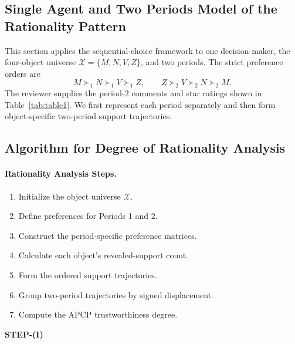 \documentclass[conference]{IEEEtran}
\theoremstyle{plain}
\theoremstyle{definition}
\theoremstyle{remark}
\begin{document}
	\subsection{Single Agent and Two Periods Model of the Rationality Pattern}
	This section applies the sequential-choice framework to one decision-maker, the four-object universe $\mathcal X=\{M,N,V,Z\}$, and two periods. The strict preference orders are
	\begin{equation}
		M\succ_1 N\succ_1 V\succ_1 Z,
		\qquad
		Z\succ_2 V\succ_2 N\succ_2 M.
	\end{equation}
	The reviewer supplies the period-2 comments and star ratings shown in Table~\ref{tab:table1}. We first represent each period separately and then form object-specific two-period support trajectories.
	\subsection{Algorithm for Degree of Rationality Analysis}
		\paragraph{Rationality Analysis Steps.}
		\begin{enumerate}[label=\textbf{STEP-(\Roman*)}, leftmargin=*]
			\item Initialize the object universe $\mathcal X$.
			\item Define preferences for Periods 1 and 2.
			\item Construct the period-specific preference matrices.
			\item Calculate each object’s revealed-support count.
			\item Form the ordered support trajectories.
			\item Group two-period trajectories by signed displacement.
			\item Compute the APCP trustworthiness degree.
		\end{enumerate}
	\begin{center}
		\textbf{STEP-(I)}
	\end{center}
\end{document}
